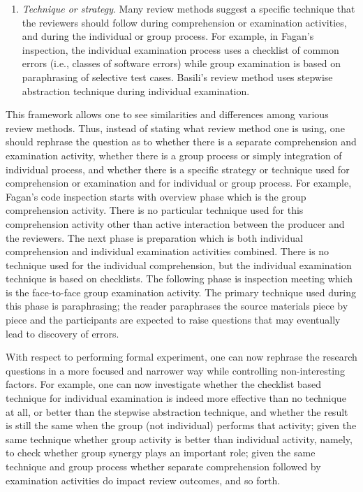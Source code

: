 \begin {itemize}
\begin {enumerate}
Other variations of group activity include face-to-face or non
face-to-face meeting format, and differences in participant roles
during the meeting (for example, whether the producer or someone else
should play the role of reader).

\item {\sl Technique or strategy}.  
Many review methods suggest a specific technique that the reviewers
should follow during comprehension or examination activities, and
during the individual or group process.  For example, in Fagan's
inspection, the individual examination process uses a checklist of
common errors (i.e., classes of software errors) while group
examination is based on paraphrasing of selective test cases. Basili's
review method \cite{Basili85} uses stepwise abstraction technique
during individual examination.

\end{enumerate}

This framework allows one to see similarities and differences among
various review methods. Thus, instead of stating what review method
one is using, one should rephrase the question as to whether there is
a separate comprehension and examination activity, whether there is a
group process or simply integration of individual process, and whether
there is a specific strategy or technique used for comprehension or
examination and for individual or group process. For example, Fagan's
code inspection \cite{Fagan76} starts with overview phase which is the
group comprehension activity. There is no particular technique used
for this comprehension activity other than active interaction between
the producer and the reviewers. The next phase is preparation which is
both individual comprehension and individual examination activities
combined. There is no technique used for the individual comprehension,
but the individual examination technique is based on checklists. The
following phase is inspection meeting which is the face-to-face group
examination activity. The primary technique used during this phase is
paraphrasing; the reader paraphrases the source materials piece by
piece and the participants are expected to raise questions that may
eventually lead to discovery of errors.

With respect to performing formal experiment, one can now rephrase the
research questions in a more focused and narrower way while
controlling non-interesting factors.  For example, one can now
investigate whether the checklist based technique for individual
examination is indeed more effective than no technique at all, or
better than the stepwise abstraction technique, and whether the result
is still the same when the group (not individual) performs that
activity; given the same technique whether group activity is better
than individual activity, namely, to check whether group synergy plays
an important role; given the same technique and group process whether
separate comprehension followed by examination activities do impact
review outcomes, and so forth.


\end{itemize}
